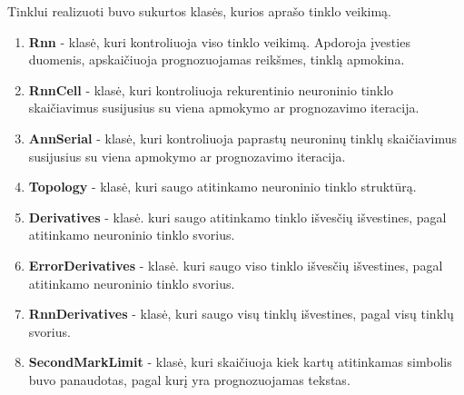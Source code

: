 \clearpage
Tinklui realizuoti buvo sukurtos klasės, kurios aprašo tinklo veikimą.

\begin{enumerate}
  \item \textbf{Rnn} - klasė, kuri kontroliuoja viso tinklo veikimą. Apdoroja įvesties duomenis, apskaičiuoja prognozuojamas reikšmes, tinklą apmokina.
  \item \textbf{RnnCell} - klasė, kuri kontroliuoja rekurentinio neuroninio tinklo skaičiavimus susijusius su viena apmokymo ar prognozavimo iteracija.
  \item \textbf{AnnSerial} - klasė, kuri kontroliuoja paprastų neuroninų tinklų skaičiavimus susijusius su viena apmokymo ar prognozavimo iteracija.
  \item \textbf{Topology} - klasė, kuri saugo atitinkamo neuroninio tinklo struktūrą.
  \item \textbf{Derivatives} - klasė. kuri saugo atitinkamo tinklo išvesčių išvestines, pagal atitinkamo neuroninio tinklo svorius.
  \item \textbf{ErrorDerivatives} - klasė. kuri saugo viso tinklo išvesčių išvestines, pagal atitinkamo neuroninio tinklo svorius.
  \item \textbf{RnnDerivatives} - klasė, kuri saugo visų tinklų išvestines, pagal visų tinklų svorius.
  \item \textbf{SecondMarkLimit} - klasė, kuri skaičiuoja kiek kartų atitinkamas simbolis buvo panaudotas, pagal kurį yra prognozuojamas tekstas.
\end{enumerate}
